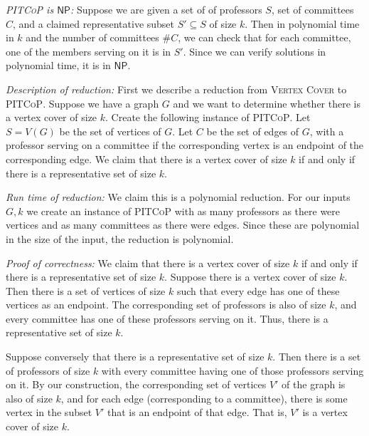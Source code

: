 \documentclass[12 pt, letterpaper]{hmcpset}
\newcommand{\NP}{$\mathsf{NP}$}
\begin{document}
\begin{solution}
	\emph{\textsc{PITCoP} is \NP:} Suppose we are given a set of of professors $S$, set of committees $C$, and a claimed representative subset $S' \subseteq S$ of size $k$. Then in polynomial time in $k$ and the number of committees $\# C$, we can check that for each committee, one of the members serving on it is in $S'$. Since we can verify solutions in polynomial time, it is in \NP.

	\emph{Description of reduction:} First we describe a reduction from \textsc{Vertex Cover} to \textsc{PITCoP}. Suppose we have a graph $G$ and we want to determine whether there is a vertex cover of size $k$. Create the following instance of \textsc{PITCoP}. Let $S = V(G)$ be the set of vertices of $G$. Let $C$ be the set of edges of $G$, with a professor serving on a committee if the corresponding vertex is an endpoint of the corresponding edge. We claim that there is a vertex cover of size $k$ if and only if there is a representative set of size $k$.

	\emph{Run time of reduction:} We claim this is a polynomial reduction. For our inputs $G, k$ we create an instance of \textsc{PITCoP} with as many professors as there were vertices and as many committees as there were edges. Since these are polynomial in the size of the input, the reduction is polynomial.

	\emph{Proof of correctness:} We claim that there is a vertex cover of size $k$ if and only if there is a representative set of size $k$. Suppose there is a vertex cover of size $k$. Then there is a set of vertices of size $k$ such that every edge has one of these vertices as an endpoint. The corresponding set of professors is also of size $k$, and every committee has one of these professors serving on it. Thus, there is a representative set of size $k$.

	Suppose conversely that there is a representative set of size $k$. Then there is a set of professors of size $k$ with every committee having one of those professors serving on it. By our construction, the corresponding set of vertices $V'$ of the graph is also of size $k$, and for each edge (corresponding to a committee), there is some vertex in the subset $V'$ that is an endpoint of that edge. That is, $V'$ is a vertex cover of size $k$.
\end{solution}

\pagebreak
\end{document}
